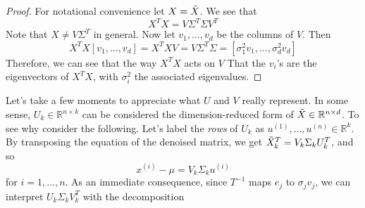 \documentclass{article}
\begin{document}
  \begin{proof}
    For notational convenience let $X = \Tilde{X}$. We see that 
    \begin{equation}
      X^T X =  V \Sigma^T \Sigma V^T
    \end{equation}
    Note that $X \neq V \Sigma^T$ in general. Now let $v_1, \ldots, v_d$ be the columns of $V$. Then 
    \begin{equation}
      X^T X [v_1, \ldots, v_d] = X^T X V = V \Sigma^T \Sigma = [\sigma_1^2 v_1, \ldots, \sigma_d^2 v_d]
    \end{equation}
    Therefore, we can see that the way $X^T X$ acts on $V$ That the $v_i$'s are the eigenvectors of $X^T X$, with $\sigma_i^2$ the associated eigenvalues. 
  \end{proof}

  Let's take a few moments to appreciate what $U$ and $V$ really represent. In some sense, $U_k \in \mathbb{R}^{n \times k}$ can be considered the dimension-reduced form of $\Tilde{X} \in \mathbb{R}^{n \times d}$. To see why consider the following. Let's label the \textit{rows} of $U_k$ as $u^{(1)}, \ldots, u^{(n)} \in \mathbb{R}^k$. By transposing the equation of the denoised matrix, we get $\Tilde{X}_k^T = V_k \Sigma_k U_k^T$, and so 
  \begin{equation}
    x^{(i)} - \mu = V_k \Sigma_k u^{(i)}
  \end{equation}
  for $i = 1, \ldots, n$. As an immediate consequence, since $T^{-1}$ maps $e_j$ to $\sigma_j v_j$, we can interpret $U_k \Sigma_k V_k^T$ with the decomposition 
  \begin{center}
  \end{center}
\end{document}
